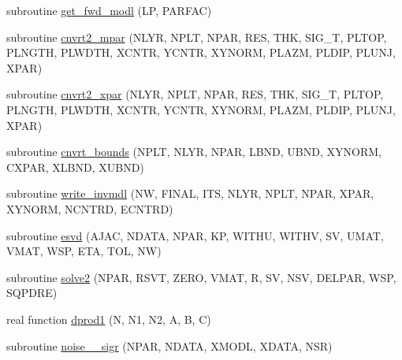 \begin{DoxyCompactItemize}
\item 
subroutine \hyperlink{Leroi_8f90_a38a723748e0c805e5dfbd851b9c62b3e}{get\+\_\+fwd\+\_\+modl} (LP, P\+A\+R\+F\+AC)
\item 
subroutine \hyperlink{Leroi_8f90_a747a5bf7d69f6533bc2f54572584ba0c}{cnvrt2\+\_\+mpar} (N\+L\+YR, N\+P\+LT, N\+P\+AR, R\+ES, T\+HK, S\+I\+G\+\_\+T, P\+L\+T\+OP, P\+L\+N\+G\+TH, P\+L\+W\+D\+TH, X\+C\+N\+TR, Y\+C\+N\+TR, X\+Y\+N\+O\+RM, P\+L\+A\+ZM, P\+L\+D\+IP, P\+L\+U\+NJ, X\+P\+AR)
\item 
subroutine \hyperlink{Leroi_8f90_aa8246fcc58fb68567634de3315aa33d2}{cnvrt2\+\_\+xpar} (N\+L\+YR, N\+P\+LT, N\+P\+AR, R\+ES, T\+HK, S\+I\+G\+\_\+T, P\+L\+T\+OP, P\+L\+N\+G\+TH, P\+L\+W\+D\+TH, X\+C\+N\+TR, Y\+C\+N\+TR, X\+Y\+N\+O\+RM, P\+L\+A\+ZM, P\+L\+D\+IP, P\+L\+U\+NJ, X\+P\+AR)
\item 
subroutine \hyperlink{Leroi_8f90_a0801b4ca30057cb8ddfb94e49185a2ce}{cnvrt\+\_\+bounds} (N\+P\+LT, N\+L\+YR, N\+P\+AR, L\+B\+ND, U\+B\+ND, X\+Y\+N\+O\+RM, C\+X\+P\+AR, X\+L\+B\+ND, X\+U\+B\+ND)
\item 
subroutine \hyperlink{Leroi_8f90_a6e7ea94365af1aa0e4cf97b842e24cf6}{write\+\_\+invmdl} (NW, F\+I\+N\+AL, I\+TS, N\+L\+YR, N\+P\+LT, N\+P\+AR, X\+P\+AR, X\+Y\+N\+O\+RM, N\+C\+N\+T\+RD, E\+C\+N\+T\+RD)
\item 
subroutine \hyperlink{Leroi_8f90_a4ee1c663696c56423ddfdd31af7fbaa8}{esvd} (A\+J\+AC, N\+D\+A\+TA, N\+P\+AR, KP, W\+I\+T\+HU, W\+I\+T\+HV, SV, U\+M\+AT, V\+M\+AT, W\+SP, E\+TA, T\+OL, NW)
\item 
subroutine \hyperlink{Leroi_8f90_a044a67601ecbe84bae3971c52173d8c1}{solve2} (N\+P\+AR, R\+S\+VT, Z\+E\+RO, V\+M\+AT, R, SV, N\+SV, D\+E\+L\+P\+AR, W\+SP, S\+Q\+P\+D\+RE)
\item 
real function \hyperlink{Leroi_8f90_a728fa0fc652b63cee1eb0d408bbac553}{dprod1} (N, N1, N2, A, B, C)
\item 
subroutine \hyperlink{Leroi_8f90_aa11bf987208a116957b481b3765c8eaf}{noise\+\_\+\_\+sigr} (N\+P\+AR, N\+D\+A\+TA, X\+M\+O\+DL, X\+D\+A\+TA, N\+SR)
\end{DoxyCompactItemize}
